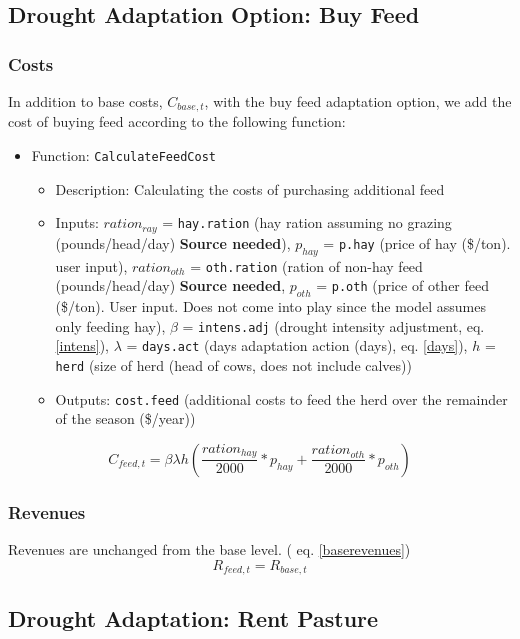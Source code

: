 \documentclass[11pt]{article}
\begin{document}
\subsection{Drought Adaptation Option: Buy Feed}
\subsubsection{Costs}
In addition to base costs, $C_{base,t}$, with the buy feed adaptation option, we add the cost of buying feed according to the following function:
\begin{itemize}
\item Function: \verb!CalculateFeedCost!
	\begin{itemize}
	\item Description: Calculating the costs of purchasing additional feed
	\item Inputs: $ration_{ray}$ = \verb!hay.ration! (hay ration assuming no grazing (pounds/head/day) \textbf{Source needed}), $p_{hay}$ = \verb!p.hay! (price of hay (\$/ton). user input), $ration_{oth}$ = \verb!oth.ration! (ration of non-hay feed (pounds/head/day) \textbf{Source needed}, $p_{oth}$ = \verb!p.oth! (price of other feed (\$/ton). User input. Does not come into play since the model assumes only feeding hay), $\beta$ = \verb!intens.adj! (drought intensity adjustment, eq. \ref{intens}), $\lambda$ = \verb!days.act! (days adaptation action (days), eq. \ref{days}), $h$ = \verb!herd! (size of herd (head of cows, does not include calves))
	\item Outputs: \verb!cost.feed! (additional costs to feed the herd over the remainder of the season (\$/year))
	\end{itemize}
\end{itemize}

\begin{equation}
C_{feed,t} = \beta \lambda h \left(\frac{ration_{hay}}{2000} * p_{hay} + \frac{ration_{oth}}{2000} * p_{oth} \right)
\end{equation}

\subsubsection{Revenues}
Revenues are unchanged from the base level. ( eq. \ref{baserevenues})
\begin{equation}
R_{feed,t} = R_{base,t}
\end{equation}

\subsection{Drought Adaptation: Rent Pasture}
\end{document}
